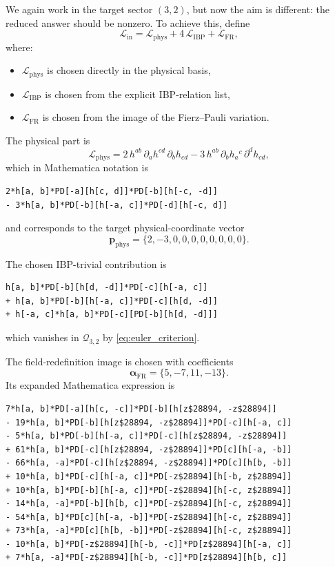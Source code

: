 \documentclass[11pt]{report}
\numberwithin{equation}{chapter}
\newcommand{\Lag}{\mathcal{L}}
\newcommand{\Qspace}[2]{\mathcal{Q}_{#1,#2}}
\newcommand{\IBP}{\mathrm{IBP}}
\newcommand{\Phys}{\mathrm{phys}}
\newcommand{\FieldRed}{\mathrm{FR}}
\begin{document}
We again work in the target sector \((3,2)\), but now the aim is different:
the reduced answer should be nonzero.
To achieve this, define
\begin{equation}
  \Lag_{\mathrm{in}}
  =
  \Lag_{\Phys}
  +
  4\,\Lag_{\IBP}
  +
  \Lag_{\FieldRed},
  \label{eq:worked_input_decomposition}
\end{equation}
where:
\begin{itemize}
\item \(\Lag_{\Phys}\) is chosen directly in the physical basis,
\item \(\Lag_{\IBP}\) is chosen from the explicit IBP-relation list,
\item \(\Lag_{\FieldRed}\) is chosen from the image of the Fierz--Pauli variation.
\end{itemize}

The physical part is
\begin{equation}
  \Lag_{\Phys}
  =
  2\,h^{ab}\,\partial_a h^{cd}\,\partial_b h_{cd}
  -
  3\,h^{ab}\,\partial_b h_{a}{}^{c}\,\partial^{d} h_{cd},
  \label{eq:worked_physical_part}
\end{equation}
which in Mathematica notation is
\begin{lstlisting}[style=mma]
2*h[a, b]*PD[-a][h[c, d]]*PD[-b][h[-c, -d]]
- 3*h[a, b]*PD[-b][h[-a, c]]*PD[-d][h[-c, d]]
\end{lstlisting}
and corresponds to the target physical-coordinate vector
\begin{equation}
  \bm{p}_{\Phys}
  =
  \{2,-3,0,0,0,0,0,0,0,0\}.
  \label{eq:worked_phys_coords}
\end{equation}

The chosen IBP-trivial contribution is
\begin{lstlisting}[style=mma]
h[a, b]*PD[-b][h[d, -d]]*PD[-c][h[-a, c]]
+ h[a, b]*PD[-b][h[-a, c]]*PD[-c][h[d, -d]]
+ h[-a, c]*h[a, b]*PD[-c][PD[-b][h[d, -d]]]
\end{lstlisting}
which vanishes in \(\Qspace{3}{2}\) by \eqref{eq:euler_criterion}.

The field-redefinition image is chosen with coefficients
\begin{equation}
  \bm{\alpha}_{\FieldRed}
  =
  \{5,-7,11,-13\}.
  \label{eq:worked_alpha}
\end{equation}
Its expanded Mathematica expression is
\begin{lstlisting}[style=mma]
7*h[a, b]*PD[-a][h[c, -c]]*PD[-b][h[z$28894, -z$28894]]
- 19*h[a, b]*PD[-b][h[z$28894, -z$28894]]*PD[-c][h[-a, c]]
- 5*h[a, b]*PD[-b][h[-a, c]]*PD[-c][h[z$28894, -z$28894]]
+ 61*h[a, b]*PD[-c][h[z$28894, -z$28894]]*PD[c][h[-a, -b]]
- 66*h[a, -a]*PD[-c][h[z$28894, -z$28894]]*PD[c][h[b, -b]]
+ 10*h[a, b]*PD[-c][h[-a, c]]*PD[-z$28894][h[-b, z$28894]]
+ 10*h[a, b]*PD[-b][h[-a, c]]*PD[-z$28894][h[-c, z$28894]]
- 14*h[a, -a]*PD[-b][h[b, c]]*PD[-z$28894][h[-c, z$28894]]
- 54*h[a, b]*PD[c][h[-a, -b]]*PD[-z$28894][h[-c, z$28894]]
+ 73*h[a, -a]*PD[c][h[b, -b]]*PD[-z$28894][h[-c, z$28894]]
- 10*h[a, b]*PD[-z$28894][h[-b, -c]]*PD[z$28894][h[-a, c]]
+ 7*h[a, -a]*PD[-z$28894][h[-b, -c]]*PD[z$28894][h[b, c]]
\end{lstlisting}
\end{document}
